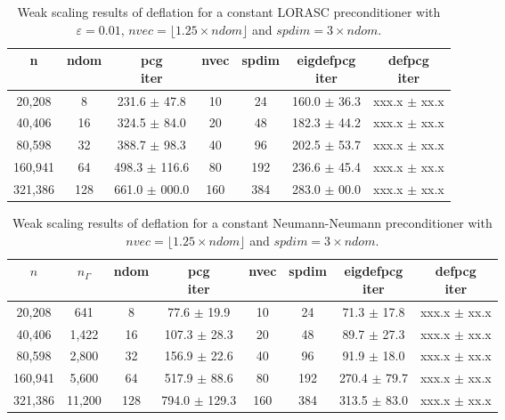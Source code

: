 \documentclass{article}
\begin{document}
\begin{table}[ht]
	\caption{Weak scaling results of deflation for a constant LORASC preconditioner with $\varepsilon=0.01$, $nvec=\lfloor1.25\times ndom\rfloor$ and $spdim=3\times ndom$.}
	\centering
	\begin{tabular}{|c|c|c|c|c|c|c|}
	\hline
	n & ndom & \makecell{pcg\\ iter} & nvec & spdim & \makecell{eigdefpcg\\ iter} & \makecell{defpcg\\ iter}\\
	\hline
	20,208  &   8 & 231.6 $\pm$  47.8 &  10 &  24 & 160.0 $\pm$ 36.3 & xxx.x $\pm$ xx.x \\
	40,406  &  16 & 324.5 $\pm$  84.0 &  20 &  48 & 182.3 $\pm$ 44.2 & xxx.x $\pm$ xx.x \\
	80,598  &  32 & 388.7 $\pm$  98.3 &  40 &  96 & 202.5 $\pm$ 53.7 & xxx.x $\pm$ xx.x \\
	160,941 &  64 & 498.3 $\pm$ 116.6 &  80 & 192 & 236.6 $\pm$ 45.4 & xxx.x $\pm$ xx.x \\
	321,386 & 128 & 661.0 $\pm$ 000.0 & 160 & 384 & 283.0 $\pm$ 00.0 & xxx.x $\pm$ xx.x \\
	\hline
\end{tabular}
	\label{Tab:015}
\end{table}



\begin{table}[ht]
	\caption{Weak scaling results of deflation for a constant Neumann-Neumann preconditioner with $nvec=\lfloor1.25\times ndom\rfloor$ and $spdim=3\times ndom$.}
	\centering
	\begin{tabular}{|c|c|c|c|c|c|c|c|}
	\hline
	$n$ & $n_\Gamma$ & ndom & \makecell{pcg\\ iter} & nvec & spdim & \makecell{eigdefpcg\\ iter} & \makecell{defpcg\\ iter}\\
	\hline
	20,208  & 641    &   8 &  77.6 $\pm$  19.9 &  10 &  24  & 71.3 $\pm$ 17.8 & xxx.x $\pm$ xx.x \\
	40,406  & 1,422  &  16 & 107.3 $\pm$  28.3 &  20 &  48  & 89.7 $\pm$ 27.3 & xxx.x $\pm$ xx.x \\
	80,598  & 2,800  &  32 & 156.9 $\pm$  22.6 &  40 &  96 &  91.9 $\pm$ 18.0 & xxx.x $\pm$ xx.x \\
	160,941 & 5,600  &  64 & 517.9 $\pm$  88.6 &  80 & 192 & 270.4 $\pm$ 79.7 & xxx.x $\pm$ xx.x \\
	321,386 & 11,200 & 128 & 794.0 $\pm$ 129.3 & 160 & 384 & 313.5 $\pm$ 83.0 & xxx.x $\pm$ xx.x \\
	\hline
    \end{tabular}
	\label{Tab:025}
\end{table}
\end{document}
